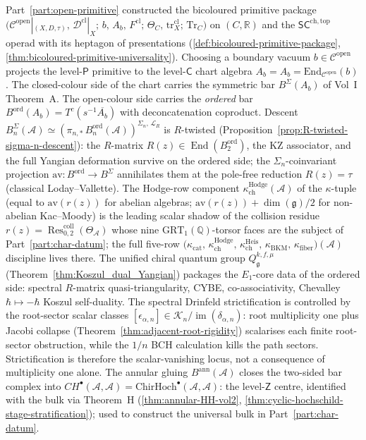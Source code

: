 \documentclass[11pt]{memoir}
\DeclareMathOperator{\End}{End}
\DeclareMathOperator{\Res}{Res}
\providecommand{\cref}[1]{\ref{#1}}
\newcommand{\cA}{\mathcal{A}}
\newcommand{\R}{\mathbb{R}}
\newcommand{\Q}{\mathbb{Q}}
\providecommand{\cD}{\mathcal{D}}
\providecommand{\cC}{\mathcal{C}}
\providecommand{\cL}{\mathcal{L}}
\providecommand{\fg}{\mathfrak{g}}
\providecommand{\ChirHoch}{CH}
\newcommand{\SCchtop}{{\mathsf{SC}^{\mathrm{ch,top}}}}
\providecommand{\openFactCat}{\cC^{\mathrm{open}}}
\providecommand{\logCurve}{(X, D, \tau)}
\providecommand{\HalfBraid}{\Theta_{C}}
\providecommand{\TraceC}{\mathrm{Tr}_{C}}
\providecommand{\bdyVac}{b}
\providecommand{\bdyAlg}{A_{b}}
\providecommand{\primPkgBicolour}{\bigl(\openFactCat|_{\logCurve},\, \cD^{\mathrm{cl}}|_{X};\, \bdyVac,\, \bdyAlg,\, F^{\mathrm{cl}};\, \HalfBraid,\, \mathrm{tr}^{\mathrm{cl}}_{X};\, \TraceC\bigr)}
\providecommand{\bulkChirHoch}[1]{\mathrm{ChirHoch}^{\bullet}(#1, #1)}
\providecommand{\kappaCat}{\kappa_{\mathrm{cat}}}
\providecommand{\kappaChHodge}{\kappa_{\mathrm{ch}}^{\mathrm{Hodge}}}
\providecommand{\kappaChHeis}{\kappa_{\mathrm{ch}}^{\mathrm{Heis}}}
\providecommand{\kappaBKM}{\kappa_{\mathrm{BKM}}}
\providecommand{\kappaFiber}{\kappa_{\mathrm{fiber}}}
\providecommand{\kappaTuple}[1]{\bigl(\kappaCat,\, \kappaChHodge,\, \kappaChHeis,\, \kappaBKM,\, \kappaFiber\bigr)(#1)}
\begin{document}
\noindent
Part~\ref{part:open-primitive} constructed the bicoloured primitive
package $\primPkgBicolour$ on $(C, \R)$ and the $\SCchtop$ operad
with its heptagon of presentations
\textup(\cref{def:bicoloured-primitive-package},
\cref{thm:bicoloured-primitive-universality}\textup). Choosing a
boundary vacuum $b \in \openFactCat$ projects the level-$\mathsf{P}$
primitive to the level-$\mathsf{C}$ chart algebra
$\bdyAlg = A_b = \mathrm{End}_{\openFactCat}(b)$. The closed-colour
side of the chart carries the symmetric bar $B^\Sigma(A_b)$ of
Vol~I Theorem~A. The open-colour side carries the \emph{ordered}
bar $B^{\mathrm{ord}}(A_b) = T^c(s^{-1}\overline{A_b})$ with
deconcatenation coproduct. Descent
$B^\Sigma_n(\cA) \simeq (\pi_{n,*}\,B^{\mathrm{ord}}_n(\cA))^{\Sigma_n,\,\cL_R}$
is $R$-twisted (Proposition~\ref{prop:R-twisted-sigma-n-descent}):
the $R$-matrix $R(z) \in \End(B^{\mathrm{ord}}_2)$, the KZ
associator, and the full Yangian deformation survive on the
ordered side; the $\Sigma_n$-coinvariant projection
$\mathrm{av}\colon B^{\mathrm{ord}} \to B^\Sigma$ annihilates them
at the pole-free reduction $R(z) = \tau$ (classical
Loday--Vallette). The Hodge-row component $\kappaChHodge(\cA)$ of the
$\kappa$-tuple
\textup(equal to $\mathrm{av}(r(z))$ for abelian algebras;
$\mathrm{av}(r(z)) + \dim(\fg)/2$ for non-abelian Kac--Moody\textup)
is the leading scalar shadow of the collision residue
$r(z) = \Res^{\mathrm{coll}}_{0,2}(\Theta_\cA)$ whose nine
$\mathrm{GRT}_1(\Q)$-torsor faces are the subject of
Part~\ref{part:char-datum}; the full five-row $\kappaTuple{\cA}$
discipline lives there. The unified chiral quantum group
$Q_\fg^{k,f,\mu}$ (Theorem~\ref{thm:Koszul_dual_Yangian})
packages the $E_1$-core data of the ordered side: spectral
$R$-matrix quasi-triangularity, CYBE, co-associativity, Chevalley
$\hbar\mapsto-\hbar$ Koszul self-duality. The spectral Drinfeld
strictification is controlled by the root-sector scalar classes
$[\epsilon_{\alpha,n}]\in
\mathscr K_n/\operatorname{im}(\delta_{\alpha,n})$: root
multiplicity one plus Jacobi collapse
(Theorem~\ref{thm:adjacent-root-rigidity}) scalarises each finite
root-sector obstruction, while the $1/n$ BCH calculation kills the
path sectors. Strictification is therefore the scalar-vanishing
locus, not a consequence of multiplicity one alone. The annular gluing
$B^{\mathrm{ann}}(\cA)$ closes the two-sided bar complex into
$\ChirHoch^\bullet(\cA, \cA) = \bulkChirHoch{\cA}$: the
level-$\mathsf{Z}$ centre, identified with the bulk via Theorem~H
\textup(\cref{thm:annular-HH-vol2},
\cref{thm:cyclic-hochschild-stage-stratification}\textup); used
to construct the universal bulk in Part~\ref{part:char-datum}.
\end{document}
